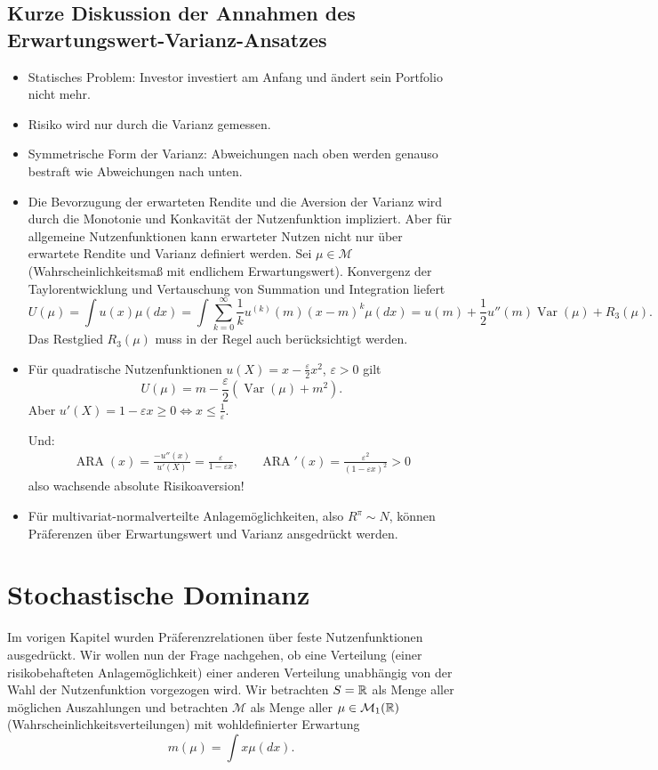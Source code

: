 \documentclass[a4paper,twoside,DIV15,BCOR12mm]{scrbook}
\newcommand{\cM}{\mathcal M}
\DeclareMathOperator{\ARA}{ARA}
\DeclareMathOperator{\Var}{Var}
\begin{document}
\subsection{Kurze Diskussion der Annahmen des Erwartungswert-Varianz-Ansatzes}

\begin{itemize}
\item Statisches Problem: Investor investiert am Anfang und ändert sein Portfolio nicht mehr.
\item Risiko wird nur durch die Varianz gemessen.
\item Symmetrische Form der Varianz: Abweichungen nach oben werden genauso bestraft wie Abweichungen nach unten.
\item Die Bevorzugung der erwarteten Rendite und die Aversion der Varianz wird durch die Monotonie und Konkavität der Nutzenfunktion impliziert. Aber für allgemeine Nutzenfunktionen kann erwarteter Nutzen nicht nur über erwartete Rendite und Varianz definiert werden. Sei $\mu\in\cM$ (Wahrscheinlichkeitsmaß mit endlichem Erwartungswert). Konvergenz der Taylorentwicklung und Vertauschung von Summation und Integration liefert 
\[
U(\mu) = \int u(x)\mu(dx) = \int \sum_{k=0}^\infty \frac 1k u^{(k)}(m)(x-m)^k\mu(dx) = u(m) + \frac12 u''(m)\Var(\mu) + R_3(\mu).
\]
Das Restglied $R_3(\mu)$ muss in der Regel auch berücksichtigt werden.

\item Für quadratische Nutzenfunktionen $u(X)=x-\frac\varepsilon2x^2$, $\varepsilon>0$ gilt
\[
U(\mu) = m - \frac\varepsilon2(\Var(\mu) + m^2).
\]
Aber $u'(X) = 1-\varepsilon x \ge 0 \iff x\le \frac1\varepsilon$. 

Und:
\begin{align*}
\ARA(x) = \frac{-u''(x)}{u'(X)} = \frac\varepsilon{1-\varepsilon x},&&
\ARA'(x) = \frac{\varepsilon^2}{(1-\varepsilon x)^2} > 0
\end{align*}
also wachsende absolute Risikoaversion!
\item Für multivariat-normalverteilte Anlagemöglichkeiten, also $R^{\pi}\sim N$, können Präferenzen über Erwartungswert und Varianz ansgedrückt werden.
\end{itemize}

\section{Stochastische Dominanz}
Im vorigen Kapitel wurden Präferenzrelationen über feste Nutzenfunktionen ausgedrückt. Wir wollen nun der Frage nachgehen, ob eine Verteilung (einer risikobehafteten Anlagemöglichkeit) einer anderen Verteilung unabhängig von der Wahl der Nutzenfunktion vorgezogen wird. Wir betrachten $S=\mathbb{R}$ als Menge aller möglichen Auszahlungen und betrachten $\cM$ als Menge aller $\mu\in\cM_1(\MdR)$ (Wahrscheinlichkeitsverteilungen) mit wohldefinierter Erwartung \[m(\mu)=\int x\mu(dx).\]
\end{document}
